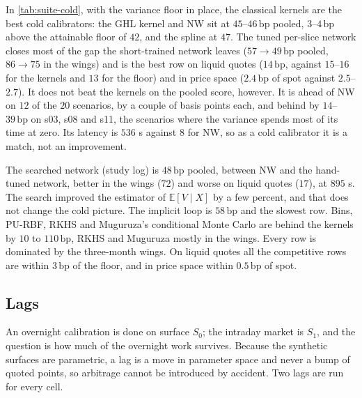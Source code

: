 \documentclass[11pt,a4paper]{article}
\newcommand{\E}{\mathbb{E}}
\newcommand{\bp}{\,\mathrm{bp}}
\begin{document}
\begin{table}[h]\centering\footnotesize
\caption{Cold suite, $20$ SSVI scenarios, mean and median over scenarios and two seeds. Liquid: $|k|\le0.25$, $T\ge0.5$. The PDE row is the attainable floor of the scoring, its seed-to-seed spread is $6.6\bp$ (the Monte Carlo noise floor of the score), and its latency is the Fokker--Planck solve. Bold: the best method row in each column; the PDE floor is the reference and is not a contender.}\label{tab:suite-cold}

\end{table}

In \cref{tab:suite-cold}, with the variance floor in place, the classical kernels are the best cold calibrators: the GHL kernel and NW sit at $45$--$46\bp$ pooled, $3$--$4\bp$ above the attainable floor of $42$, and the spline at $47$. The tuned per-slice network closes most of the gap the short-trained network leaves ($57\to49\bp$ pooled, $86\to75$ in the wings) and is the best row on liquid quotes ($14\bp$, against $15$--$16$ for the kernels and $13$ for the floor) and in price space ($2.4\bp$ of spot against $2.5$--$2.7$). It does not beat the kernels on the pooled score, however. It is ahead of NW on $12$ of the $20$ scenarios, by a couple of basis points each, and behind by $14$--$39\bp$ on s03, s08 and s11, the scenarios where the variance spends most of its time at zero. Its latency is $536$ s against $8$ for NW, so as a cold calibrator it is a match, not an improvement.

The searched network (study log) is $48\bp$ pooled, between NW and the hand-tuned network, better in the wings ($72$) and worse on liquid quotes ($17$), at $895$ s. The search improved the estimator of $\E[V\mid X]$ by a few percent, and that does not change the cold picture. The implicit loop is $58\bp$ and the slowest row. Bins, PU-RBF, RKHS and Muguruza's conditional Monte Carlo are behind the kernels by $10$ to $110\bp$, RKHS and Muguruza mostly in the wings. Every row is dominated by the three-month wings. On liquid quotes all the competitive rows are within $3\bp$ of the floor, and in price space within $0.5\bp$ of spot.


\subsection{Lags}\label{sec:suite-lag}

An overnight calibration is done on surface $S_0$; the intraday market is $S_1$, and the question is how much of the overnight work survives. Because the synthetic surfaces are parametric, a lag is a move in parameter space and never a bump of quoted points, so arbitrage cannot be introduced by accident. Two lags are run for every cell.
\end{document}
